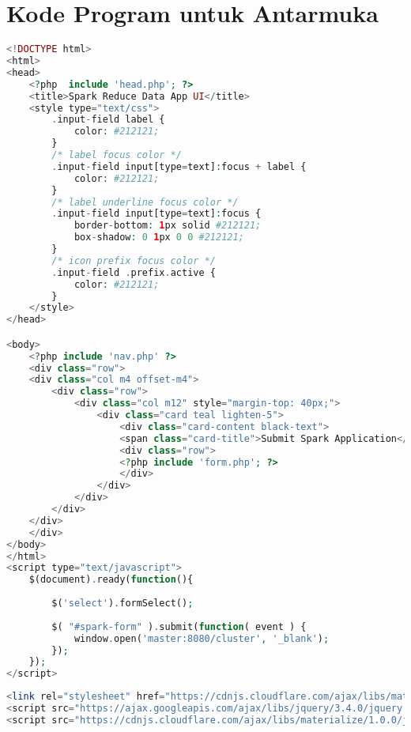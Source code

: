 \chapter{Kode Program untuk Antarmuka}
\label{lamp:B}

\begin{lstlisting}[language=PHP, caption=index.php]
<!DOCTYPE html>
<html>
<head>
	<?php  include 'head.php'; ?>
	<title>Spark Reduce Data App UI</title>
	<style type="text/css">
		.input-field label {
			color: #212121;
		}
		/* label focus color */
		.input-field input[type=text]:focus + label {
			color: #212121;
		}
		/* label underline focus color */
		.input-field input[type=text]:focus {
			border-bottom: 1px solid #212121;
			box-shadow: 0 1px 0 0 #212121;
		}
		/* icon prefix focus color */
		.input-field .prefix.active {
			color: #212121;
		}	
	</style>
</head>

<body>
	<?php include 'nav.php' ?>
	<div class="row">
	<div class="col m4 offset-m4">
		<div class="row">
			<div class="col m12" style="margin-top: 40px;">
				<div class="card teal lighten-5">
					<div class="card-content black-text">
					<span class="card-title">Submit Spark Application</span>
					<div class="row">
					<?php include 'form.php'; ?>
					</div>
				</div>
			</div>
		</div>   
	</div>
	</div>
</body>
</html>
<script type="text/javascript">
	$(document).ready(function(){
		
		$('select').formSelect();
		
		$( "#spark-form" ).submit(function( event ) {
  			window.open('master:8080/cluster', '_blank');
		});
	});
</script>
\end{lstlisting}

\begin{lstlisting}[language=PHP, caption=head.php]
<link rel="stylesheet" href="https://cdnjs.cloudflare.com/ajax/libs/materialize/1.0.0/css/materialize.min.css">
<script src="https://ajax.googleapis.com/ajax/libs/jquery/3.4.0/jquery.min.js"></script>
<script src="https://cdnjs.cloudflare.com/ajax/libs/materialize/1.0.0/js/materialize.min.js"></script>
\end{lstlisting}

